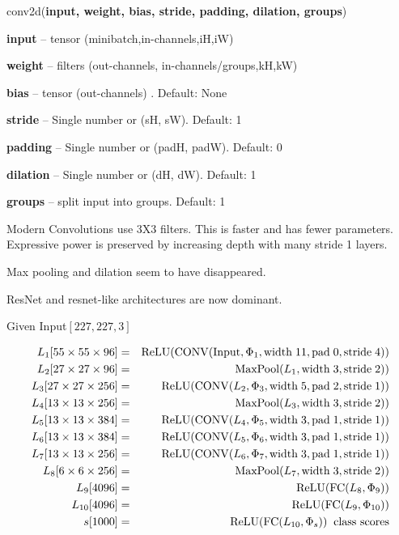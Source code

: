 {

conv2d({\bf input, weight, bias, stride, padding, dilation, groups})

\bigskip
{\bf input} – tensor (minibatch,in-channels,iH,iW)

\medskip
{\bf weight} – filters (out-channels, in-channels/groups,kH,kW)

\medskip
{\bf bias} – tensor (out-channels) . Default: None

\medskip
{\bf stride} – Single number or (sH, sW). Default: 1

\medskip
{\bf padding} – Single number or (padH, padW). Default: 0

\medskip
{\bf dilation} – Single number or (dH, dW). Default: 1

\medskip
{\bf groups} – split input into groups. Default: 1


Modern Convolutions use 3X3 filters.  This is faster and has fewer parameters.  Expressive power is preserved by increasing depth with many stride 1 layers.

\vfill
Max pooling and dilation seem to have disappeared.

\vfill
ResNet and resnet-like architectures are now dominant.

{\huge
\centerline{Given Input$[227,227,3]$}

\begin{eqnarray*}
L_1[55 \times 55 \times 96] & = & \mathrm{ReLU}(\mathrm{CONV}(\mathrm{Input},\Phi_1,\mathrm{width}\;11,\mathrm{pad}\;0,\mathrm{stride}\;4)) \\
L_2[27 \times 27 \times 96] & = & \mathrm{MaxPool}(L_1,\mathrm{width}\;3,\mathrm{stride}\;2))  \\
L_3[27 \times 27 \times 256] & = & \mathrm{ReLU}(\mathrm{CONV}(L_2,\Phi_3,\mathrm{width}\;5,\mathrm{pad}\;2,\mathrm{stride}\;1))  \\
L_4[13 \times 13 \times 256] & = & \mathrm{MaxPool}(L_3,\mathrm{width}\;3,\mathrm{stride}\;2))  \\
L_5[13 \times 13 \times 384] & = & \mathrm{ReLU}(\mathrm{CONV}(L_4,\Phi_5,\mathrm{width}\;3,\mathrm{pad}\;1,\mathrm{stride}\;1))  \\
L_6[13 \times 13 \times 384] & = & \mathrm{ReLU}(\mathrm{CONV}(L_5,\Phi_6,\mathrm{width}\;3,\mathrm{pad}\;1,\mathrm{stride}\;1))  \\
L_7[13 \times 13 \times 256] & = & \mathrm{ReLU}(\mathrm{CONV}(L_6,\Phi_7,\mathrm{width}\;3,\mathrm{pad}\;1,\mathrm{stride}\;1))  \\
L_8[6 \times 6 \times 256] & = & \mathrm{MaxPool}(L_7,\mathrm{width}\;3,\mathrm{stride}\;2)) \\
L_9[4096] & = & \mathrm{ReLU}(\mathrm{FC}(L_8,\Phi_9)) \\
L_{10}[4096] & = & \mathrm{ReLU}(\mathrm{FC}(L_9,\Phi_{10})) \\
s[1000] & = & \mathrm{ReLU}(\mathrm{FC}(L_{10},\Phi_s)) \;\;\mbox{class scores}
\end{eqnarray*}
}

}
